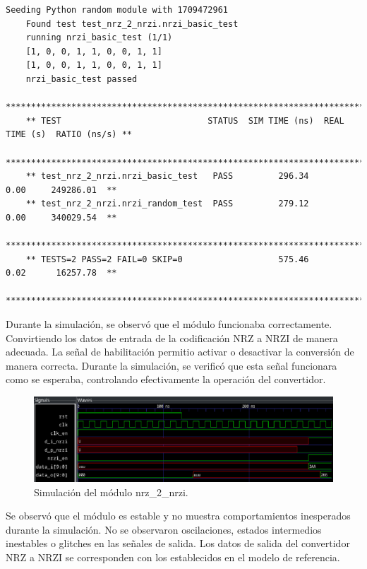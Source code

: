   {\tiny\begin{lstlisting}[caption= "Resultados \textit{test} de conversor NRZ a NRZI.]
    Seeding Python random module with 1709472961
    Found test test_nrz_2_nrzi.nrzi_basic_test
    running nrzi_basic_test (1/1)
    [1, 0, 0, 1, 1, 0, 0, 1, 1]
    [1, 0, 0, 1, 1, 0, 0, 1, 1]
    nrzi_basic_test passed
    *****************************************************************************************
    ** TEST                             STATUS  SIM TIME (ns)  REAL TIME (s)  RATIO (ns/s) **
    *****************************************************************************************
    ** test_nrz_2_nrzi.nrzi_basic_test   PASS         296.34           0.00     249286.01  **
    ** test_nrz_2_nrzi.nrzi_random_test  PASS         279.12           0.00     340029.54  **
    *****************************************************************************************
    ** TESTS=2 PASS=2 FAIL=0 SKIP=0                   575.46           0.02      16257.78  **
    *****************************************************************************************
  \end{lstlisting}}

  Durante la simulación, se observó que el módulo funcionaba correctamente.
  Convirtiendo los datos de entrada de la codificación NRZ a NRZI de manera
  adecuada. La señal de habilitación permitio activar o desactivar la
  conversión de manera correcta. Durante la simulación, se verificó que esta
  señal funcionara como se esperaba, controlando efectivamente la operación
  del convertidor.

  \begin{figure}[h]
    \centering
    \includegraphics[width=1\textwidth]{./Figures/nrz2nrzi.png}
    \caption{Simulación del módulo nrz\_2\_nrzi.}\label{fig:nrzi}
  \end{figure}

  Se observó que el módulo es estable y no muestra comportamientos inesperados
  durante la simulación. No se observaron oscilaciones, estados intermedios
  inestables o glitches en las señales de salida. Los datos de salida del
  convertidor NRZ a NRZI se corresponden con los establecidos en el modelo de
  referencia.

